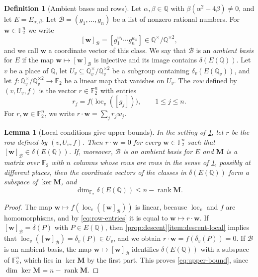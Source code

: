 \documentclass[12pt,oneside,openany]{book}
\theoremstyle{definition}
\theoremstyle{plain}
\numberwithin{equation}{chapter}
\theoremstyle{plain}
\newtheorem{lemma}[lemma]{Lemma}
\theoremstyle{definition}
\newtheorem{definition}[definition]{Definition}
\theoremstyle{remark}
\newcommand{\Q}{\mathbb Q}
\newcommand{\F}{\mathbb F}
\DeclareMathOperator{\rk}{rank}
\newcommand{\sq}[1]{[#1]}
\newcommand{\sqgp}[1]{#1^{\times}/#1^{\times2}}
\newcommand{\cB}{\mathcal B}
\begin{document}
\begin{definition}[Ambient bases and rows]\label{def:rows}
Let $\alpha,\beta\in\Q$ with $\beta(\alpha^2-4\beta)\ne0$, and let $E=E_{\alpha,\beta}$. Let $\cB=(g_1,\dots,g_n)$ be a list of nonzero rational numbers. For $\mathbf w\in\F_2^n$ we write
\begin{equation}\label{eq:coordinates}
\sq{\mathbf w}_{\cB}=\sq{g_1^{w_1}\cdots g_n^{w_n}}\in\sqgp\Q,
\end{equation}
and we call $\mathbf w$ a coordinate vector of this class. We say that $\cB$ is an \emph{ambient basis} for $E$ if the map $\mathbf w\mapsto\sq{\mathbf w}_{\cB}$ is injective and its image contains $\delta(E(\Q))$. Let $v$ be a place of $\Q$, let $U_v\subseteq\sqgp{\Q_v}$ be a subgroup containing $\delta_v(E(\Q_v))$, and let $f\colon\sqgp{\Q_v}\to\F_2$ be a linear map that vanishes on $U_v$. The \emph{row} defined by $(v,U_v,f)$ is the vector $r\in\F_2^n$ with entries
\begin{equation}\label{eq:row-entries}
r_j=f\bigl(\operatorname{loc}_v(\sq{g_j})\bigr),\qquad1\le j\le n.
\end{equation}
For $r,\mathbf w\in\F_2^n$, we write $r\cdot\mathbf w=\sum_jr_jw_j$.
\end{definition}

\begin{lemma}[Local conditions give upper bounds]\label{lem:upper-bound}
In the setting of \cref{def:rows}, let $r$ be the row defined by $(v,U_v,f)$. Then $r\cdot\mathbf w=0$ for every $\mathbf w\in\F_2^n$ such that $\sq{\mathbf w}_{\cB}\in\delta(E(\Q))$. If, moreover, $\cB$ is an ambient basis for $E$ and $\mathbf M$ is a matrix over $\F_2$ with $n$ columns whose rows are rows in the sense of \cref{def:rows}, possibly at different places, then the coordinate vectors of the classes in $\delta(E(\Q))$ form a subspace of $\ker\mathbf M$, and
\begin{equation}\label{eq:upper-bound}
\dim_{\F_2}\delta(E(\Q))\le n-\rk\mathbf M.
\end{equation}
\end{lemma}

\begin{proof}
The map $\mathbf w\mapsto f(\operatorname{loc}_v(\sq{\mathbf w}_{\cB}))$ is linear, because $\operatorname{loc}_v$ and $f$ are homomorphisms, and by \eqref{eq:row-entries} it is equal to $\mathbf w\mapsto r\cdot\mathbf w$. If $\sq{\mathbf w}_{\cB}=\delta(P)$ with $P\in E(\Q)$, then \cref{prop:descent}\ref{item:descent-local} implies that $\operatorname{loc}_v(\sq{\mathbf w}_{\cB})=\delta_v(P)\in U_v$, and we obtain $r\cdot\mathbf w=f(\delta_v(P))=0$. If $\cB$ is an ambient basis, the map $\mathbf w\mapsto\sq{\mathbf w}_{\cB}$ identifies $\delta(E(\Q))$ with a subspace of $\F_2^n$, which lies in $\ker\mathbf M$ by the first part. This proves \eqref{eq:upper-bound}, since $\dim\ker\mathbf M=n-\rk\mathbf M$.
\end{proof}
\end{document}
